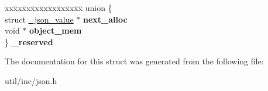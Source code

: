\begin{DoxyCompactItemize}
\begin{tabbing}
\end{tabbing}\item 
\mbox{\label{struct__json__value_a94d33c18d26d1207cc6d0d40e9484186}} 
\begin{tabbing}
xx\=xx\=xx\=xx\=xx\=xx\=xx\=xx\=xx\=\kill
union \{\\
\>struct \mbox{\hyperlink{struct__json__value}{\_json\_value}} $\ast$ {\bfseries next\_alloc}\\
\>void $\ast$ {\bfseries object\_mem}\\
\} {\bfseries \_reserved}\\

\end{tabbing}\end{DoxyCompactItemize}


The documentation for this struct was generated from the following file\+:\begin{DoxyCompactItemize}
\item 
util/inc/json.\+h\end{DoxyCompactItemize}
